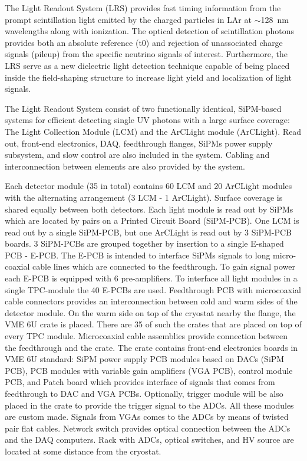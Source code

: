 The Light Readout System (LRS) provides fast timing information from the prompt scintillation light emitted by the charged particles in LAr at $\sim$\SI{128}{\nano\metre} wavelengths along with ionization. The optical detection of scintillation photons provides both an absolute reference (t0) and rejection of unassociated charge signals (pileup) from the specific neutrino signals of interest. Furthermore, the LRS serve as a new dielectric light detection technique capable of being placed inside the field-shaping structure to increase light yield and localization of light signals.

The Light Readout System consist of two functionally identical, SiPM-based systems for efficient detecting single UV photons with a large surface coverage: The Light Collection Module (LCM) and the ArCLight module (ArCLight). Read out, front-end electronics, DAQ, feedthrough flanges, SiPMs power supply subsystem, and slow control are also included in the system. Cabling and interconnection between elements are also provided by the system.

Each detector module (\num{35} in total) contains \num{60} LCM and \num{20} ArCLight modules with the alternating arrangement (\num{3} LCM - \num{1} ArCLight). Surface coverage is shared equally between both detectors. Each light module is read out by SiPMs which are located by pairs on a Printed Circuit Board (SiPM-PCB). One LCM is read out by a single SiPM-PCB, but one ArCLight is read out by \num{3} SiPM-PCB boards. \num{3} SiPM-PCBs are grouped together by insertion to a single E-shaped PCB - E-PCB. The E-PCB is intended to interface SiPMs signals to long micro-coaxial cable lines which are connected to the feedthrough. To gain signal power each E-PCB is equipped with \num{6} pre-amplifiers. To interface all light modules in a single TPC-module the \num{40} E-PCBs are used. Feedthrough PCB with microcoaxial cable connectors provides an interconnection between cold and warm sides of the detector module. On the warm side on top of the cryostat nearby the flange, the VME 6U crate is placed. There are 35 of such the crates that are placed on top of every TPC module. Microcoaxial cable assemblies provide connection between the feedthrough and the crate. The crate contains front-end electronics boards in VME 6U standard: SiPM power supply PCB modules based on DACs (SiPM PCB), PCB modules with variable gain amplifiers (VGA PCB), control module PCB, and Patch board which provides interface of signals that comes from feedthrough to DAC and VGA PCBs. Optionally, trigger module will be also placed in the crate to provide the trigger signal to the ADCs. All these modules are custom made. Signals from VGAs comes to the ADCs by means of twisted pair flat cables. Network switch provides optical connection between the ADCs and the DAQ computers. Rack with ADCs, optical switches, and HV source are located at some distance from the cryostat.  

